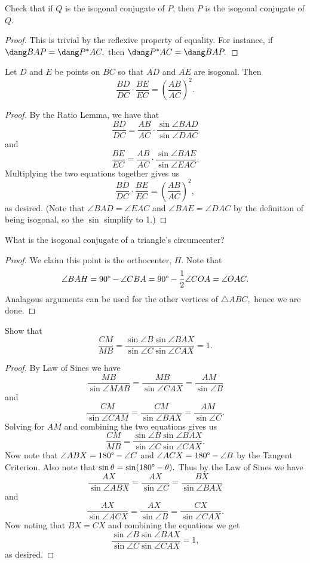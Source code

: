 \documentclass[letterpaper,oneside]{scrartcl}
\providecommand{\ol}{\overline}
\begin{document}
\begin{problem*}
  [4.21]
  Check that if $Q$ is the isogonal conjugate of $P$, then $P$ is the isogonal conjugate of $Q$. 
\end{problem*}
\begin{proof}
  This is trivial by the reflexive property of equality. For instance, if $\dang BAP = \dang P^*AC,$ then $\dang P^*AC = \dang BAP.$ 
\end{proof}

\begin{theorem*}
  Let $D$ and $E$ be points on $\ol{BC}$ so that $\ol{AD}$ and $\ol{AE}$ are isogonal. Then
  $$\frac{BD}{DC}\cdot\frac{BE}{EC}=\left(\frac{AB}{AC}\right)^2.$$
\end{theorem*}
\begin{proof}
  By the Ratio Lemma, we have that
  $$\frac{BD}{DC} = \frac{AB}{AC}\cdot\frac{\sin\angle BAD}{\sin\angle DAC}$$ and $$\frac{BE}{EC} = \frac{AB}{AC}\cdot\frac{\sin\angle BAE}{\sin\angle EAC}.$$ 
  Multiplying the two equations together gives us
  $$\frac{BD}{DC}\cdot\frac{BE}{EC}=\left(\frac{AB}{AC}\right)^2,$$ as desired. (Note that $\angle BAD = \angle EAC$ and $\angle BAE = \angle DAC$ by the definition of being isogonal, so the $\sin$ simplify to 1.)
\end{proof}

\begin{problem*}
  [4.23]
  What is the isogonal conjugate of a triangle’s circumcenter? 
\end{problem*}
\begin{proof}
  We claim this point is the orthocenter, $H$. Note that $$\angle BAH = 90\degree - \angle CBA = 90\degree - \frac12\angle COA = \angle OAC.$$
  Analagous arguments can be used for the other vertices of $\triangle ABC,$ hence we are done.
\end{proof}

\begin{problem*}
  [4.25]
  Show that
  $$\frac{CM}{MB} = \frac{\sin\angle B \sin\angle BAX}{\sin\angle C \sin\angle CAX} =1.$$
\end{problem*}
\begin{proof}
  By Law of Sines we have
  $$\frac{MB}{\sin\angle MAB} = \frac{MB}{\sin\angle CAX} = \frac{AM}{\sin\angle B}$$
  and $$\frac{CM}{\sin\angle CAM} = \frac{CM}{\sin\angle BAX} = \frac{AM}{\sin\angle C}.$$
  Solving for $AM$ and combining the two equations gives us
  $$\frac{CM}{MB} = \frac{\sin\angle B \sin\angle BAX}{\sin\angle C \sin\angle CAX}.$$
  Now note that $\angle ABX = 180\degree - \angle C$ and $\angle ACX = 180\degree - \angle B$ by the Tangent Criterion. Also note that $\sin\theta = \sin(180\degree - \theta).$ Thus by the Law of Sines we have
  $$\frac{AX}{\sin\angle ABX} = \frac{AX}{\sin\angle C} = \frac{BX}{\sin\angle BAX}$$ 
  and $$\frac{AX}{\sin\angle ACX} = \frac{AX}{\sin\angle B} = \frac{CX}{\sin\angle CAX}.$$
  Now noting that $BX = CX$ and combining the equations we get 
  $$\frac{\sin\angle B \sin\angle BAX}{\sin\angle C \sin\angle CAX} = 1,$$ as desired.
\end{proof}
\end{document}
